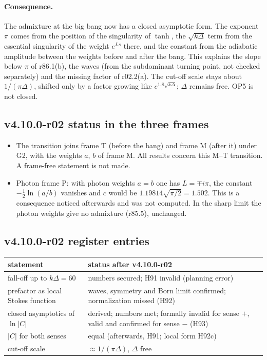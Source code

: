 \paragraph{Consequence.}
The admixture at the big bang now has a closed asymptotic form.  The exponent \(\pi\) comes from the position of the singularity of \(\tanh\), the
\(\sqrt{k\Delta}\) term from the essential singularity of the weight \(e^{Ls}\) there, and the constant from the adiabatic amplitude between the
weights before and after the bang.  This explains the slope below \(\pi\) of r86.1(b), the waves (from the subdominant turning point, not checked
separately) and the missing factor of r02.2(a).  The cut-off scale stays about \(1/(\pi\Delta)\), shifted only by a factor growing like
\(e^{1.8\sqrt{k\Delta}}\); \(\Delta\) remains free.  OP5 is not closed.

\subsection*{v4.10.0-r02 status in the three frames}
\label{subsec:v4100-r02-frames}

\begin{itemize}[leftmargin=2em]
\item The transition joins frame T (before the bang) and frame M (after it) under G2, with the weights \(a\), \(b\) of frame M.  All results concern
this M--T transition.  A frame-free statement is not made.
\item Photon frame P: with photon weights \(a=b\) one has \(L=\mp i\pi\), the constant \(-\tfrac12\ln(a/b)\) vanishes and \(c\) would be
\(1.19814\sqrt{\pi/2}=1.502\).  This is a consequence noticed afterwards and was not computed.  In the sharp limit the photon weights give no
admixture (r85.5), unchanged.
\end{itemize}

\subsection*{v4.10.0-r02 register entries}
\label{subsec:v4100-r02-register}

\begin{center}
\small
\begin{tabular}{@{}>{\raggedright\arraybackslash}p{}>{\raggedright\arraybackslash}p{}@{}}
\toprule
statement & status after v4.10.0-r02\\
\midrule
fall-off up to \(k\Delta=60\) & numbers secured; H91 invalid (planning error)\\
prefactor as local Stokes function & waves, symmetry and Born limit confirmed; normalization missed (H92)\\
closed asymptotics of \(\ln|C|\) & derived; numbers met; formally invalid for sense \(+\), valid and confirmed for sense \(-\) (H93)\\
\(|C|\) for both senses & equal (afterwards, H91; local form H92c)\\
cut-off scale & \(\approx1/(\pi\Delta)\), \(\Delta\) free\\
\bottomrule
\end{tabular}
\end{center}

